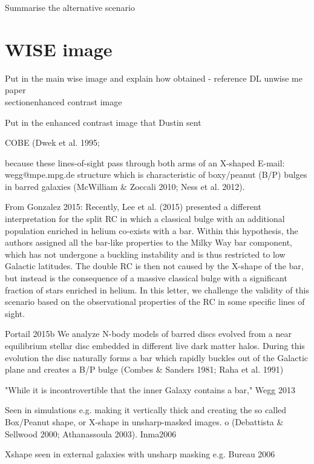 \documentclass[12pt, preprint]{aastex}
\begin{document}
Summarise the alternative scenario \\

\section{WISE image} 

Put in the main wise image and explain how obtained - reference DL unwise me paper \\

section{enhanced contrast image} 

Put in the enhanced contrast image that Dustin sent 

COBE (Dwek et al. 1995;

because these lines-of-sight pass through both arms of an X-shaped
 E-mail: wegg@mpe.mpg.de
structure which is characteristic of boxy/peanut (B/P) bulges
in barred galaxies (McWilliam & Zoccali 2010; Ness et al.
2012).

From Gonzalez 2015: Recently, Lee et al. (2015) presented a different interpretation
for the split RC in which a classical bulge with an additional
population enriched in helium co-exists with a bar. Within this
hypothesis, the authors assigned all the bar-like properties to the
Milky Way bar component, which has not undergone a buckling
instability and is thus restricted to low Galactic latitudes.
The double RC is then not caused by the X-shape of the bar, but
instead is the consequence of a massive classical bulge with a
significant fraction of stars enriched in helium. In this letter, we
challenge the validity of this scenario based on the observational
properties of the RC in some specific lines of sight.




Portail 2015b We analyze N-body models of barred discs evolved from a near
equilibrium stellar disc embedded in different live dark matter halos.
During this evolution the disc naturally forms a bar which
rapidly buckles out of the Galactic plane and creates a B/P bulge
(Combes & Sanders 1981; Raha et al. 1991)

"While it is incontrovertible that the inner Galaxy contains a bar," Wegg 2013

Seen in simulations e.g. making it vertically thick and creating the so
called Box/Peanut shape, or X-shape in unsharp-masked images.
o (Debattista & Sellwood 2000; Athanassoula
2003). Inma2006

Xshape seen in external galaxies with unsharp masking e.g. Bureau 2006
\end{document}

